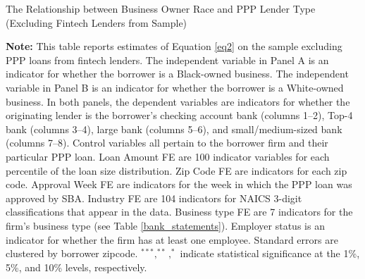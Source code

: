 \documentclass[11pt]{article}
\begin{document}
\newpage
\begin{table}[H]
	\caption{The Relationship between Business Owner Race and PPP Lender Type (Excluding Fintech Lenders from Sample)} \label{regs_nofintech_fe}
	\begin{adjustbox}{width=\linewidth}
		
	\end{adjustbox}
	
	\begin{adjustbox}{width=\linewidth}
		
	\end{adjustbox}

	\begin{minipage}{\textwidth} \medskip
		\footnotesize{{\bf Note: }This table reports estimates of Equation \ref{eq2} on the sample excluding PPP loans from fintech lenders. The independent variable in Panel A is an indicator for whether the borrower is a Black-owned business. The independent variable in Panel B is an indicator for whether the borrower is a White-owned business. In both panels, the dependent variables are indicators for whether the originating lender is the borrower's checking account bank (columns 1--2), Top-4 bank (columns 3--4), large bank (columns 5--6), and small/medium-sized bank (columns 7--8). Control variables all pertain to the borrower firm and their particular PPP loan. Loan Amount FE are 100 indicator variables for each percentile of the loan size distribution. Zip Code FE are indicators for each zip code. Approval Week FE are indicators for the week in which the PPP loan was approved by SBA. Industry FE are 104 indicators for NAICS 3-digit classifications that appear in the data. Business type FE are 7 indicators for the firm's business type (see Table \ref{bank_statements}). Employer status is an indicator for whether the firm has at least one employee. Standard errors are clustered by borrower zipcode. $^{***}, ^{**}, ^{*}$ indicate statistical significance at the 1\%, 5\%, and 10\% levels, respectively.}
	\end{minipage}
\end{table}
\end{document}
